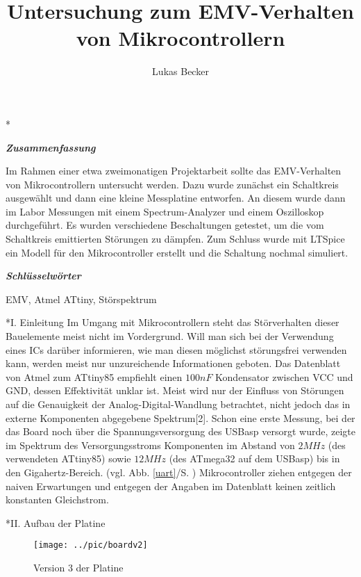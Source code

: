 \documentclass[a4paper,10pt, twocolumn]{article}
\title{Untersuchung zum EMV-Verhalten von Mikrocontrollern}
\author{Lukas Becker}
\begin{document}
\maketitle

\begin{section}*{}

\textbf{\emph{Zusammenfassung}}
\begin{bfseries}Im Rahmen einer etwa zweimonatigen Projektarbeit 
sollte das EMV-Verhalten 
von Mikrocontrollern  
untersucht werden. Dazu wurde zunächst ein Schaltkreis ausgewählt und dann eine 
kleine 
Messplatine entworfen. An diesem wurde dann im Labor Messungen mit 
einem Spectrum-Analyzer und einem Oszilloskop durchgeführt. Es wurden 
verschiedene Beschaltungen getestet, um die vom Schaltkreis emittierten 
Störungen zu dämpfen. Zum Schluss wurde mit 
LTSpice ein Modell für den Mikrocontroller erstellt und die Schaltung nochmal 
simuliert.
\end{bfseries}
\newline
\textbf{\emph{Schlüsselwörter}}
\begin{bfseries}
EMV, Atmel ATtiny, Störspektrum
\end{bfseries}
\end{section}
\begin{section}*{I. Einleitung}
Im Umgang mit Mikrocontrollern steht das Störverhalten dieser Bauelemente 
meist nicht im Vordergrund. Will man sich bei der Verwendung eines ICs darüber 
informieren, wie man diesen möglichst störungsfrei verwenden kann,
werden meist nur unzureichende Informationen geboten.
\newline
Das Datenblatt von Atmel zum ATtiny85 empfiehlt einen $100nF$ Kondensator 
zwischen VCC und GND, dessen Effektivität unklar ist. Meist wird nur der 
Einfluss von Störungen auf die Genauigkeit der Analog-Digital-Wandlung 
betrachtet, nicht jedoch das in externe Komponenten abgegebene Spektrum[2]. 
Schon eine erste 
Messung, bei der das Board noch über die Spannungsversorgung des USBasp 
versorgt wurde, zeigte im Spektrum des Versorgungsstroms Komponenten im Abstand 
von $2MHz$ (des verwendeten ATtiny85) 
sowie $12MHz$ (des ATmega32 auf dem USBasp) bis in den Gigahertz-Bereich.
(vgl. Abb. \ref{uart}/S. \pageref{uart})
\newline
Mikrocontroller ziehen entgegen der naiven Erwartungen und entgegen der Angaben 
im Datenblatt keinen zeitlich konstanten 
Gleichstrom.
\end{section}
\begin{section}*{II. Aufbau der Platine}
\begin{figure}[H]
  \texttt{[image: ../pic/boardv2]}
  \caption{Version 3 der Platine}
  \label{board}
\end{figure}
\end{section}
\end{document}
